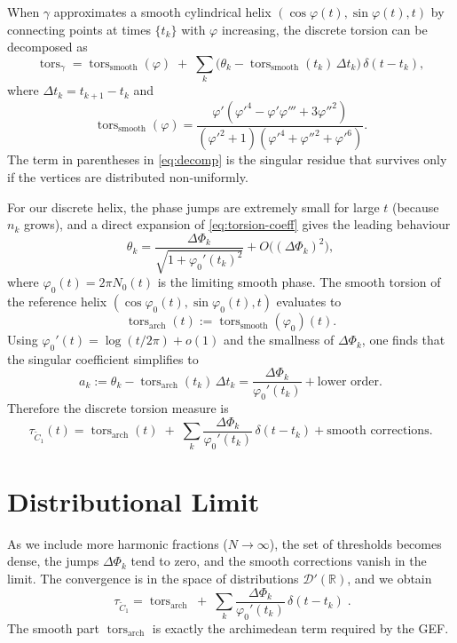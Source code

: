 \documentclass[11pt,a4paper]{article}
\newcommand{\R}{\mathbb{R}}
\newcommand{\D}{\mathcal{D}'}
\newcommand{\tors}{\operatorname{tors}}
\begin{document}
When \(\gamma\) approximates a smooth cylindrical helix
\((\cos\varphi(t),\sin\varphi(t),t)\) by connecting points at times
\(\{t_k\}\) with \(\varphi\) increasing, the discrete torsion can be
decomposed as
\begin{equation}\label{eq:decomp}
\tors_\gamma = \tors_{\text{smooth}}(\varphi) \;+\;
\sum_k \bigl( \theta_k - \tors_{\text{smooth}}(t_k)\,\Delta t_k \bigr)\,\delta(t-t_k),
\end{equation}
where \(\Delta t_k = t_{k+1}-t_k\) and
\[
\tors_{\text{smooth}}(\varphi) =
\frac{\varphi'(\varphi'^4 - \varphi'\varphi''' + 3\varphi''^2)}
{(\varphi'^2+1)(\varphi'^4+\varphi''^2+\varphi'^6)}.
\]
The term in parentheses in \eqref{eq:decomp} is the singular residue that
survives only if the vertices are distributed non‑uniformly.

For our discrete helix, the phase jumps are extremely small for large
\(t\) (because \(n_k\) grows), and a direct expansion of \eqref{eq:torsion-coeff}
gives the leading behaviour
\[
\theta_k = \frac{\Delta\Phi_k}{\sqrt{1+\varphi_0'(t_k)^2}} + O\bigl((\Delta\Phi_k)^2\bigr),
\]
where \(\varphi_0(t)=2\pi N_0(t)\) is the limiting smooth phase.  The
smooth torsion of the reference helix \((\cos\varphi_0(t),\sin\varphi_0(t),t)\)
evaluates to
\[
\tors_{\text{arch}}(t) := \tors_{\text{smooth}}(\varphi_0)(t).
\]
Using \(\varphi_0'(t) = \log(t/2\pi) + o(1)\) and the smallness of
\(\Delta\Phi_k\), one finds that the singular coefficient simplifies to
\[
a_k := \theta_k - \tors_{\text{arch}}(t_k)\,\Delta t_k
= \frac{\Delta\Phi_k}{\varphi_0'(t_k)} + \text{lower order}.
\]
Therefore the discrete torsion measure is
\begin{equation}\label{eq:tau-disc}
\tau_{\widetilde C_1}(t) = \tors_{\text{arch}}(t) \;+\;
\sum_k \frac{\Delta\Phi_k}{\varphi_0'(t_k)}\,\delta(t-t_k)
+ \text{smooth corrections}.
\end{equation}

\section{Distributional Limit}

As we include more harmonic fractions (\(N\to\infty\)), the set of
thresholds becomes dense, the jumps \(\Delta\Phi_k\) tend to zero, and
the smooth corrections vanish in the limit.  The convergence is in the
space of distributions \(\D(\R)\), and we obtain
\[
\boxed{\; \tau_{\widetilde C_1} = \tors_{\text{arch}} \;+\;
\sum_{k} \frac{\Delta\Phi_k}{\varphi_0'(t_k)}\,\delta(t-t_k) \; }.
\]
The smooth part \(\tors_{\text{arch}}\) is exactly the archimedean term
required by the GEF.
\end{document}
